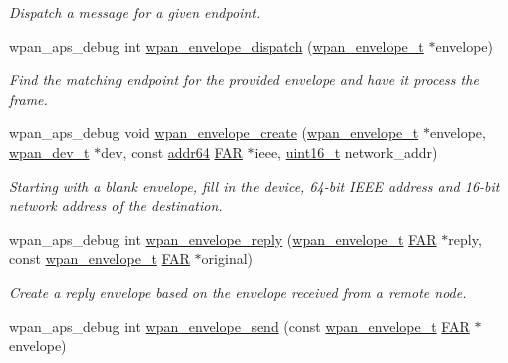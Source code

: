 \begin{DoxyCompactItemize}
\begin{DoxyCompactList}\small\item\em Dispatch a message for a given endpoint. \end{DoxyCompactList}\item 
wpan\+\_\+aps\+\_\+debug int \hyperlink{group__wpan__aps_gae84eafd10f51de6cdac4732b8948606d}{wpan\+\_\+envelope\+\_\+dispatch} (\hyperlink{structwpan__envelope__t}{wpan\+\_\+envelope\+\_\+t} $\ast$envelope)
\begin{DoxyCompactList}\small\item\em Find the matching endpoint for the provided {\ttfamily envelope} and have it process the frame. \end{DoxyCompactList}\item 
wpan\+\_\+aps\+\_\+debug void \hyperlink{group__wpan__aps_ga95e2bb4e4c546191c059f54179064fc3}{wpan\+\_\+envelope\+\_\+create} (\hyperlink{structwpan__envelope__t}{wpan\+\_\+envelope\+\_\+t} $\ast$envelope, \hyperlink{structwpan__dev__t}{wpan\+\_\+dev\+\_\+t} $\ast$dev, const \hyperlink{unionaddr64}{addr64} \hyperlink{group__hal_gaef060b3456fdcc093a7210a762d5f2ed}{F\+AR} $\ast$ieee, \hyperlink{group__hal__dos_ga5a8b2dc9e45a9ee81a94ef304fb62505}{uint16\+\_\+t} network\+\_\+addr)
\begin{DoxyCompactList}\small\item\em Starting with a blank envelope, fill in the device, 64-\/bit I\+E\+EE address and 16-\/bit network address of the destination. \end{DoxyCompactList}\item 
wpan\+\_\+aps\+\_\+debug int \hyperlink{group__wpan__aps_gaaaee02ff456d4f6103a5e94c2ba106c5}{wpan\+\_\+envelope\+\_\+reply} (\hyperlink{structwpan__envelope__t}{wpan\+\_\+envelope\+\_\+t} \hyperlink{group__hal_gaef060b3456fdcc093a7210a762d5f2ed}{F\+AR} $\ast$reply, const \hyperlink{structwpan__envelope__t}{wpan\+\_\+envelope\+\_\+t} \hyperlink{group__hal_gaef060b3456fdcc093a7210a762d5f2ed}{F\+AR} $\ast$original)
\begin{DoxyCompactList}\small\item\em Create a reply envelope based on the envelope received from a remote node. \end{DoxyCompactList}\item 
wpan\+\_\+aps\+\_\+debug int \hyperlink{group__wpan__aps_ga06f1e9e86b74ef807ded44b79b13e283}{wpan\+\_\+envelope\+\_\+send} (const \hyperlink{structwpan__envelope__t}{wpan\+\_\+envelope\+\_\+t} \hyperlink{group__hal_gaef060b3456fdcc093a7210a762d5f2ed}{F\+AR} $\ast$envelope)

\end{DoxyCompactItemize}
